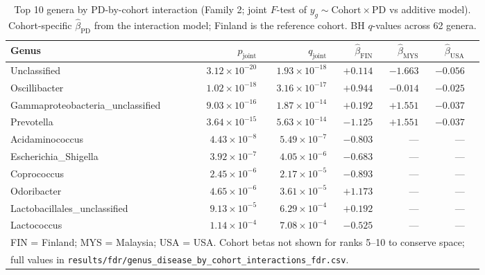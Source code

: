 \documentclass[12pt,a4paper]{article}
\begin{document}
\begin{table}[h]
\centering
\caption{Top 10 genera by PD-by-cohort interaction (Family 2; joint
$F$-test of $y_g \sim \mathrm{Cohort}\times\mathrm{PD}$ vs additive model).
Cohort-specific $\hat\beta_{\mathrm{PD}}$ from the interaction model;
Finland is the reference cohort. BH $q$-values across 62 genera.}
\label{tab:interaction-top}
\begin{tabular}{lrrrrrr}
\toprule
Genus & $p_{\mathrm{joint}}$ & $q_{\mathrm{joint}}$ &
  $\hat\beta_{\mathrm{FIN}}$ & $\hat\beta_{\mathrm{MYS}}$ &
  $\hat\beta_{\mathrm{USA}}$ \\
\midrule
Unclassified                     & $3.12\times10^{-20}$ & $1.93\times10^{-18}$ & $+0.114$ & $-1.663$ & $-0.056$ \\
Oscillibacter                    & $1.02\times10^{-18}$ & $3.16\times10^{-17}$ & $+0.944$ & $-0.014$ & $-0.025$ \\
Gammaproteobacteria\_unclassified& $9.03\times10^{-16}$ & $1.87\times10^{-14}$ & $+0.192$ & $+1.551$ & $-0.037$ \\
Prevotella                       & $3.64\times10^{-15}$ & $5.63\times10^{-14}$ & $-1.125$ & $+1.551$ & $-0.037$ \\
Acidaminococcus                  & $4.43\times10^{-8}$  & $5.49\times10^{-7}$  & $-0.803$ & --- & --- \\
Escherichia\_Shigella            & $3.92\times10^{-7}$  & $4.05\times10^{-6}$  & $-0.683$ & --- & --- \\
Coprococcus                      & $2.45\times10^{-6}$  & $2.17\times10^{-5}$  & $-0.893$ & --- & --- \\
Odoribacter                      & $4.65\times10^{-6}$  & $3.61\times10^{-5}$  & $+1.173$ & --- & --- \\
Lactobacillales\_unclassified    & $9.13\times10^{-5}$  & $6.29\times10^{-4}$  & $+0.192$ & --- & --- \\
Lactococcus                      & $1.14\times10^{-4}$  & $7.08\times10^{-4}$  & $-0.525$ & --- & --- \\
\bottomrule
\multicolumn{6}{l}{\footnotesize FIN = Finland; MYS = Malaysia; USA = USA.
Cohort betas not shown for ranks 5--10 to conserve space;} \\
\multicolumn{6}{l}{\footnotesize full values in \texttt{results/fdr/genus\_disease\_by\_cohort\_interactions\_fdr.csv}.} \\
\end{tabular}
\end{table}
\end{document}

